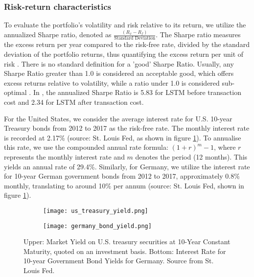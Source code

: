 \documentclass{article}
\begin{document}
\subsubsection{Risk-return characteristics} 
To evaluate the portfolio's volatility and risk relative to its return, we utilize the annualized Sharpe ratio, denoted as $\frac{(R_x-R_f)}{\text{Standard Deviation}}$. The Sharpe ratio measures the excess return per year compared to the risk-free rate, divided by the standard deviation of the portfolio returns, thus quantifying the excess return per unit of risk \citep{sharpe1998sharpe}. There is no standard definition for a 'good' Sharpe Ratio. Usually, any Sharpe Ratio greater than 1.0 is considered an acceptable good, which offers excess returns relative to volatility, while a ratio under 1.0 is considered sub-optimal \citep{investopedia_sharpe_ratio}. In  \cite{fischer2018deep}, the annualized Sharpe Ratio is 5.83 for LSTM before transaction cost and 2.34 for LSTM after transaction cost. 

For the United States, we consider the average interest rate for U.S. 10-year Treasury bonds from 2012 to 2017 as the risk-free rate. The monthly interest rate is recorded at 2.17\% (source: St. Louis Fed, as shown in figure \ref{fig:risk free}). To annualise this rate, we use the compounded annual rate formula: $(1 + r)^m - 1$, where $r$ represents the monthly interest rate and $m$ denotes the period (12 months). This yields an annual rate of 29.4\%. Similarly, for Germany, we utilize the interest rate for 10-year German government bonds from 2012 to 2017, approximately 0.8\% monthly, translating to around 10\% per annum (source: St. Louis Fed, shown in figure \ref{fig:risk free}).

\begin{figure}[!ht]
    \centering
    \begin{subfigure}[b]{\textwidth} 
      \texttt{[image: us\_treasury\_yield.png]}
    \end{subfigure}
    \hfill
    \begin{subfigure}[b]{\textwidth} 
      \texttt{[image: germany\_bond\_yield.png]}
    \end{subfigure}
    \caption{Upper: Market Yield on U.S. treasury securities at 10-Year Constant Maturity, quoted on an investment basis. Bottom: Interest Rate for 10-year Government Bond Yields for Germany. Source from St. Louis Fed.}
    \label{fig:risk free}
\end{figure}
\end{document}
